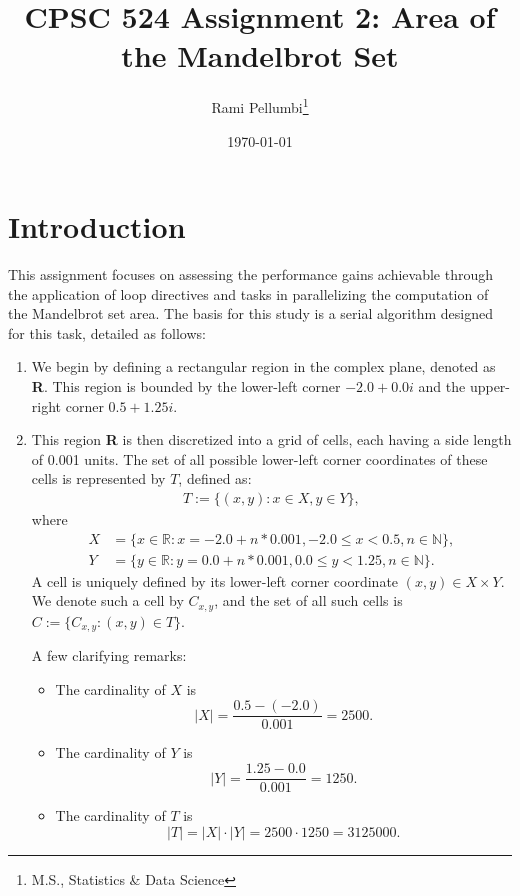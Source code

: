 \documentclass{article}
\title{CPSC 524 Assignment 2: Area of the Mandelbrot Set}
\author{Rami Pellumbi\thanks{M.S., Statistics \& Data Science}}
\date{\today}
\begin{document}
\maketitle

\newpage 

\section{Introduction}

This assignment focuses on assessing the performance gains achievable through 
the application of loop directives and tasks in parallelizing the computation 
of the Mandelbrot set area. The basis for this study is a serial algorithm 
designed for this task, detailed as follows:

\begin{enumerate}
    \item We begin by defining a rectangular region in the complex plane, denoted as \textbf{R}. This region is bounded by the lower-left corner $-2.0 + 0.0i$ and the upper-right corner $0.5 + 1.25i$.
    \item This region \textbf{R} is then discretized into a grid of cells, each having a side length of 0.001 units. The set of all possible lower-left corner coordinates of these cells is represented by $T$, defined as:
    \begin{align*}
        T := \{(x, y) : x \in X, y \in Y \},
    \end{align*}
    where 
    \begin{align*}
        X &= \{x \in \mathbb{R} : x = -2.0 + n * 0.001, -2.0 \leq x < 0.5, n \in \mathbb{N}\}, \\
        Y &= \{y \in \mathbb{R} : y = 0.0 + n * 0.001, 0.0 \leq y < 1.25, n \in \mathbb{N}\}.
    \end{align*}
    A cell is uniquely defined by its lower-left corner coordinate $(x, y) \in X \times Y$. 
    We denote such a cell by $C_{x,y}$, and the set of all such cells is $C := \{C_{x, y}: (x, y) \in T\}$.
    
    A few clarifying remarks:
    \begin{itemize}
        \item The cardinality of $X$ is $$\lvert X \rvert = \frac{0.5 - (-2.0)}{0.001} = 2500.$$
        \item The cardinality of $Y$ is $$\lvert Y \rvert = \frac{1.25 - 0.0}{0.001} = 1250.$$
        \item The cardinality of $T$ is $$\lvert T \rvert = \lvert X \rvert \cdot \lvert Y \rvert = 2500 \cdot 1250 = 3125000.$$
    \end{itemize}
    

\end{enumerate}
\end{document}
